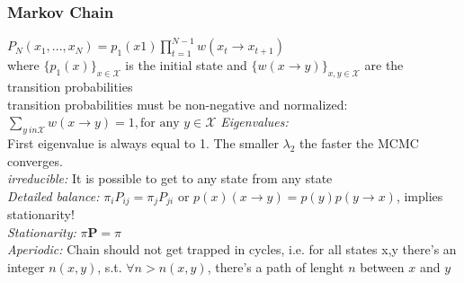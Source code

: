 \documentclass[9pt,parskip]{scrartcl}
\begin{document}
\begin{multicols*}{4}
\subsubsection*{Markov Chain}

$P_N (x_1,... ,x_N ) = p_1(x1) \prod^{N-1}_{t=1} w(x_t \to x_{t+1})$ \\ 
where $\{p_1(x)\}_{x \in \mathcal{X}}$ is the initial state and $\{w(x \to y)\}_{x,y \in \mathcal{X}}$ are the
transition probabilities \\
 transition probabilities must be
non-negative and normalized:
$\sum_{y \ in \mathcal{X}} w(x \to y) = 1 , \text{for any } y \in \mathcal{X}$
\textit{Eigenvalues: }\\
First eigenvalue is always equal to 1. The smaller $\lambda_2$ the faster the MCMC converges. \\
\textit{irreducible: } It is possible to get to any state from any state \\
\textit{Detailed balance: } $\pi _{i}P_{ij}=\pi _{j}P_{ji}$ or $p(x) (x \to y) = p(y) p(y \to x)$, implies stationarity! \\
\textit{Stationarity: } $\pi \mathbf {P} =\pi$ \\
\textit{Aperiodic: } Chain should not get trapped in cycles, i.e. for all states x,y there's an integer $n(x,y)$, s.t. $\forall n > n(x,y)$, there's a path of lenght $n$ between $x$ and $y$ \\



\end{multicols*}
\end{document}
